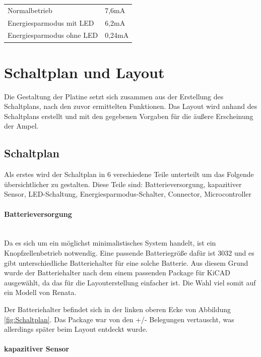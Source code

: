 \documentclass[a4paper,
DIV=13,
12pt,
BCOR=10mm,
department=FakEI,
parskip=half,
automark,
]{article}
\begin{document}
\begin{center}
\begin{tabularx}{\columnwidth}{XX}
Normalbetrieb & 7,6mA \\ 
Energiesparmodus mit LED & 6,2mA\\
Energiesparmodus ohne LED & 0,24mA
\label{tab:ADEinton}
\end{tabularx}
\end{center}





\newpage
\section{Schaltplan und Layout}

Die Gestaltung der Platine setzt sich zusammen aus der Erstellung des Schaltplans, nach den zuvor ermittelten Funktionen. Das Layout wird anhand des Schaltplans erstellt und mit den gegebenen Vorgaben für die äußere Erscheinung der Ampel.

\subsection{Schaltplan}

Als erstes wird der Schaltplan in 6 verschiedene Teile unterteilt um das Folgende übersichtlicher zu gestalten. Diese Teile sind: Batterieversorgung, kapazitiver Sensor, LED-Schaltung, Energiesparmodus-Schalter, Connector, Microcontroller


\paragraph{Batterieversorgung} $~$ \\

Da es sich um ein möglichst minimalistisches System handelt, ist ein Knopfzellenbetrieb notwendig. Eine passende Batteriegröße dafür ist 3032 und es gibt unterschiedliche Batteriehalter für eine solche Batterie. Aus diesem Grund wurde der Batteriehalter nach dem einem passenden Package für KiCAD ausgewählt, da das für die Layouterstellung einfacher ist. Die Wahl viel somit auf ein Modell von Renata. 

Der Batteriehalter befindet sich in der linken oberen Ecke von Abbildung \ref{fig:Schaltplan}. Das Package war von den +/- Belegungen vertauscht, was allerdings später beim Layout entdeckt wurde.

\paragraph{kapazitiver Sensor} $~$ \\
\end{document}
